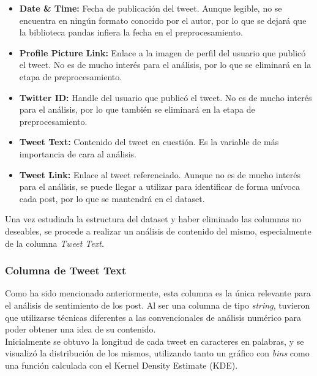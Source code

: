 \documentclass[a4paper, 12pt]{report}
\begin{document}
                        \begin{itemize}
                                \item \textbf{Date \& Time:} Fecha de publicación del tweet. Aunque legible, no se encuentra en ningún formato conocido por el autor, por lo que se dejará que la biblioteca pandas infiera la fecha en el preprocesamiento.
                                \item \textbf{Profile Picture Link:} Enlace a la imagen de perfil del usuario que publicó el tweet. No es de mucho interés para el análisis, por lo que se eliminará en la etapa de preprocesamiento.
                                \item \textbf{Twitter ID:} Handle del usuario que publicó el tweet. No es de mucho interés para el análisis, por lo que también se eliminará en la etapa de preprocesamiento.
                                \item \textbf{Tweet Text:} Contenido del tweet en cuestión. Es la variable de más importancia de cara al análisis.
                                \item \textbf{Tweet Link:} Enlace al tweet referenciado. Aunque no es de mucho interés para el análisis, se puede llegar a utilizar para identificar de forma unívoca cada post, por lo que se mantendrá en el dataset.
                        \end{itemize}

                        Una vez estudiada la estructura del dataset y haber eliminado las columnas no deseables, se procede a realizar un 
                        análisis de contenido del mismo, especialmente de la columna \textit{Tweet Text}.\\

                        \subsubsection{Columna de Tweet Text}

                        Como ha sido mencionado anteriormente, esta columna es la única relevante para el análisis de sentimiento de los post. Al ser una columna de tipo \textit{string},
                        tuvieron que utilizarse técnicas diferentes a las convencionales de análisis numérico para poder obtener una idea de su contenido.\\

                        Inicialmente se obtuvo la longitud de cada tweet en caracteres en palabras, y se visualizó la distribución de los mismos, utilizando 
                        tanto un gráfico con \textit{bins} como una función calculada con el Kernel Density Estimate (KDE).\\
\end{document}
